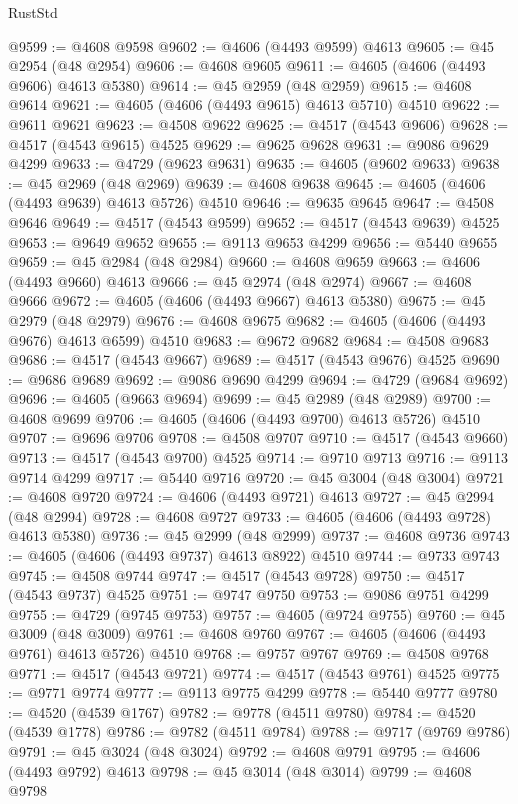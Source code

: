 \begin{lexlean}{RustStd}
\begin{coremodule}
@9599 := @4608 @9598
@9602 := @4606 (@4493 @9599) @4613
@9605 := @45 @2954 (@48 @2954)
@9606 := @4608 @9605
@9611 := @4605 (@4606 (@4493 @9606) @4613 @5380)
@9614 := @45 @2959 (@48 @2959)
@9615 := @4608 @9614
@9621 := @4605 (@4606 (@4493 @9615) @4613 @5710) @4510
@9622 := @9611 @9621
@9623 := @4508 @9622
@9625 := @4517 (@4543 @9606)
@9628 := @4517 (@4543 @9615) @4525
@9629 := @9625 @9628
@9631 := @9086 @9629 @4299
@9633 := @4729 (@9623 @9631)
@9635 := @4605 (@9602 @9633)
@9638 := @45 @2969 (@48 @2969)
@9639 := @4608 @9638
@9645 := @4605 (@4606 (@4493 @9639) @4613 @5726) @4510
@9646 := @9635 @9645
@9647 := @4508 @9646
@9649 := @4517 (@4543 @9599)
@9652 := @4517 (@4543 @9639) @4525
@9653 := @9649 @9652
@9655 := @9113 @9653 @4299
@9656 := @5440 @9655
@9659 := @45 @2984 (@48 @2984)
@9660 := @4608 @9659
@9663 := @4606 (@4493 @9660) @4613
@9666 := @45 @2974 (@48 @2974)
@9667 := @4608 @9666
@9672 := @4605 (@4606 (@4493 @9667) @4613 @5380)
@9675 := @45 @2979 (@48 @2979)
@9676 := @4608 @9675
@9682 := @4605 (@4606 (@4493 @9676) @4613 @6599) @4510
@9683 := @9672 @9682
@9684 := @4508 @9683
@9686 := @4517 (@4543 @9667)
@9689 := @4517 (@4543 @9676) @4525
@9690 := @9686 @9689
@9692 := @9086 @9690 @4299
@9694 := @4729 (@9684 @9692)
@9696 := @4605 (@9663 @9694)
@9699 := @45 @2989 (@48 @2989)
@9700 := @4608 @9699
@9706 := @4605 (@4606 (@4493 @9700) @4613 @5726) @4510
@9707 := @9696 @9706
@9708 := @4508 @9707
@9710 := @4517 (@4543 @9660)
@9713 := @4517 (@4543 @9700) @4525
@9714 := @9710 @9713
@9716 := @9113 @9714 @4299
@9717 := @5440 @9716
@9720 := @45 @3004 (@48 @3004)
@9721 := @4608 @9720
@9724 := @4606 (@4493 @9721) @4613
@9727 := @45 @2994 (@48 @2994)
@9728 := @4608 @9727
@9733 := @4605 (@4606 (@4493 @9728) @4613 @5380)
@9736 := @45 @2999 (@48 @2999)
@9737 := @4608 @9736
@9743 := @4605 (@4606 (@4493 @9737) @4613 @8922) @4510
@9744 := @9733 @9743
@9745 := @4508 @9744
@9747 := @4517 (@4543 @9728)
@9750 := @4517 (@4543 @9737) @4525
@9751 := @9747 @9750
@9753 := @9086 @9751 @4299
@9755 := @4729 (@9745 @9753)
@9757 := @4605 (@9724 @9755)
@9760 := @45 @3009 (@48 @3009)
@9761 := @4608 @9760
@9767 := @4605 (@4606 (@4493 @9761) @4613 @5726) @4510
@9768 := @9757 @9767
@9769 := @4508 @9768
@9771 := @4517 (@4543 @9721)
@9774 := @4517 (@4543 @9761) @4525
@9775 := @9771 @9774
@9777 := @9113 @9775 @4299
@9778 := @5440 @9777
@9780 := @4520 (@4539 @1767)
@9782 := @9778 (@4511 @9780)
@9784 := @4520 (@4539 @1778)
@9786 := @9782 (@4511 @9784)
@9788 := @9717 (@9769 @9786)
@9791 := @45 @3024 (@48 @3024)
@9792 := @4608 @9791
@9795 := @4606 (@4493 @9792) @4613
@9798 := @45 @3014 (@48 @3014)
@9799 := @4608 @9798

\end{coremodule}
\end{lexlean}
